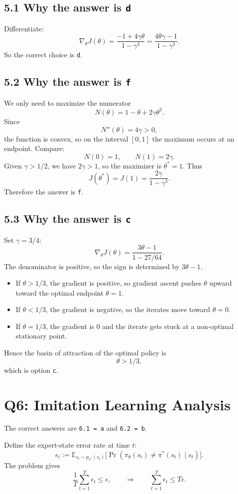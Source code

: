 \documentclass[11pt]{article}
\newcommand{\E}{\mathbb{E}}
\newcommand{\1}{\mathbf{1}}
\newcommand{\eps}{\epsilon}
\begin{document}
\subsection*{5.1 Why the answer is \texttt{d}}
Differentiate:
\[
\nabla_\theta J(\theta)
=
\frac{-1+4\gamma\theta}{1-\gamma^3}
=
\frac{4\theta\gamma-1}{1-\gamma^3}.
\]
So the correct choice is \texttt{d}.

\subsection*{5.2 Why the answer is \texttt{f}}
We only need to maximize the numerator
\[
N(\theta)=1-\theta+2\gamma\theta^2.
\]
Since
\[
N''(\theta)=4\gamma>0,
\]
the function is convex, so on the interval $[0,1]$ the maximum occurs at an endpoint. Compare:
\[
N(0)=1,\qquad N(1)=2\gamma.
\]
Given $\gamma>1/2$, we have $2\gamma>1$, so the maximizer is $\theta^*=1$. Thus
\[
J(\theta^*)=J(1)=\frac{2\gamma}{1-\gamma^3}.
\]
Therefore the answer is \texttt{f}.

\subsection*{5.3 Why the answer is \texttt{c}}
Set $\gamma=3/4$:
\[
\nabla_\theta J(\theta)
=
\frac{3\theta-1}{1-27/64}.
\]
The denominator is positive, so the sign is determined by $3\theta-1$.
\begin{itemize}[leftmargin=2em]
\item If $\theta>1/3$, the gradient is positive, so gradient ascent pushes $\theta$ upward toward the optimal endpoint $\theta=1$.
\item If $\theta<1/3$, the gradient is negative, so the iterates move toward $\theta=0$.
\item If $\theta=1/3$, the gradient is 0 and the iterate gets stuck at a non-optimal stationary point.
\end{itemize}
Hence the basin of attraction of the optimal policy is
\[
\theta>1/3,
\]
which is option \texttt{c}.

\section{Q6: Imitation Learning Analysis}
The correct answers are \texttt{6.1 = a} and \texttt{6.2 = b}.

Define the expert-state error rate at time $t$:
\[
\eps_t
:=
\E_{s_t\sim p_{\pi^*}(s_t)}
\big[
\Pr(\pi_\theta(s_t)\neq \pi^*(s_t)\mid s_t)
\big].
\]
The problem gives
\[
\frac{1}{T}\sum_{t=1}^T \eps_t \le \eps,
\qquad\Longrightarrow\qquad
\sum_{t=1}^T \eps_t \le T\eps.
\]
\end{document}
